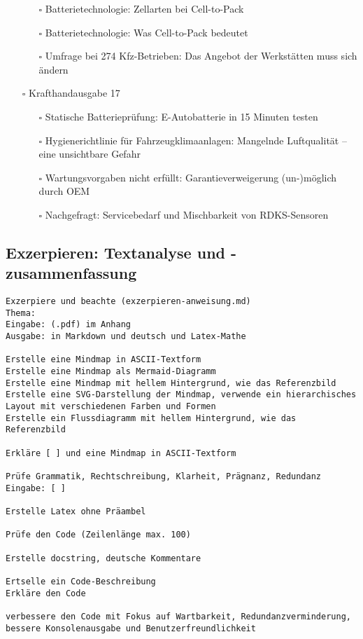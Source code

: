 \documentclass{vorlage-design-main}
\begin{document}
\begin{itemize}
  \begin{itemize}
  
  \item[$\square$]
    Batterietechnologie: Zellarten bei Cell-to-Pack
  \item[$\square$]
    Batterietechnologie: Was Cell-to-Pack bedeutet
  \item[$\square$]
    Umfrage bei 274 Kfz-Betrieben: Das Angebot der Werkstätten muss sich
    ändern
  \end{itemize}
\item[$\square$]
  Krafthandausgabe 17

  \begin{itemize}
  
  \item[$\square$]
    Statische Batterieprüfung: E-Autobatterie in 15 Minuten testen
  \item[$\square$]
    Hygienerichtlinie für Fahrzeugklimaanlagen: Mangelnde Luftqualität
    -- eine unsichtbare Gefahr
  \item[$\square$]
    Wartungsvorgaben nicht erfüllt: Garantieverweigerung (un-)möglich
    durch OEM
  \item[$\square$]
    Nachgefragt: Servicebedarf und Mischbarkeit von RDKS-Sensoren
  \end{itemize}
\end{itemize}

\subsection{Exzerpieren: Textanalyse und
-zusammenfassung}\label{exzerpieren-textanalyse-und--zusammenfassung}

\begin{lstlisting}
Exzerpiere und beachte (exzerpieren-anweisung.md)
Thema:
Eingabe: (.pdf) im Anhang
Ausgabe: in Markdown und deutsch und Latex-Mathe

Erstelle eine Mindmap in ASCII-Textform
Erstelle eine Mindmap als Mermaid-Diagramm
Erstelle eine Mindmap mit hellem Hintergrund, wie das Referenzbild
Erstelle eine SVG-Darstellung der Mindmap, verwende ein hierarchisches Layout mit verschiedenen Farben und Formen
Erstelle ein Flussdiagramm mit hellem Hintergrund, wie das Referenzbild

Erkläre [ ] und eine Mindmap in ASCII-Textform

Prüfe Grammatik, Rechtschreibung, Klarheit, Prägnanz, Redundanz
Eingabe: [ ]

Erstelle Latex ohne Präambel

Prüfe den Code (Zeilenlänge max. 100)

Erstelle docstring, deutsche Kommentare

Ertselle ein Code-Beschreibung
Erkläre den Code

verbessere den Code mit Fokus auf Wartbarkeit, Redundanzverminderung, bessere Konsolenausgabe und Benutzerfreundlichkeit
\end{lstlisting}



\clearpage
\printbibliography
\end{document}
